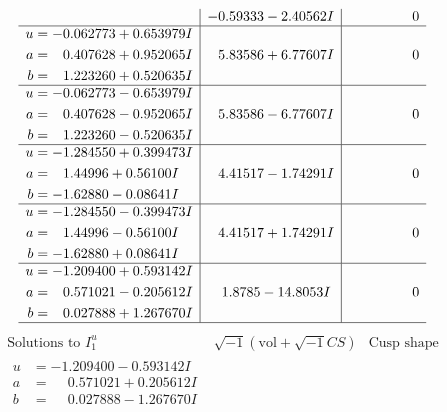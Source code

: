 \documentclass[1p]{elsarticle_modified}
\theoremstyle{definition}
\newcommand{\I}{\sqrt{-1}}
\begin{document}
$$\begin{array}{c|c|c}
 & -0.59333 - 2.40562 I & \phantom{-0.000000 } 0 \\ \hline\begin{aligned}
u &= -0.062773 + 0.653979 I \\
a &= \phantom{-}0.407628 + 0.952065 I \\
b &= \phantom{-}1.223260 + 0.520635 I\end{aligned}
 & \phantom{-}5.83586 + 6.77607 I & \phantom{-0.000000 } 0 \\ \hline\begin{aligned}
u &= -0.062773 - 0.653979 I \\
a &= \phantom{-}0.407628 - 0.952065 I \\
b &= \phantom{-}1.223260 - 0.520635 I\end{aligned}
 & \phantom{-}5.83586 - 6.77607 I & \phantom{-0.000000 } 0 \\ \hline\begin{aligned}
u &= -1.284550 + 0.399473 I \\
a &= \phantom{-}1.44996 + 0.56100 I \\
b &= -1.62880 - 0.08641 I\end{aligned}
 & \phantom{-}4.41517 - 1.74291 I & \phantom{-0.000000 } 0 \\ \hline\begin{aligned}
u &= -1.284550 - 0.399473 I \\
a &= \phantom{-}1.44996 - 0.56100 I \\
b &= -1.62880 + 0.08641 I\end{aligned}
 & \phantom{-}4.41517 + 1.74291 I & \phantom{-0.000000 } 0 \\ \hline\begin{aligned}
u &= -1.209400 + 0.593142 I \\
a &= \phantom{-}0.571021 - 0.205612 I \\
b &= \phantom{-}0.027888 + 1.267670 I\end{aligned}
 & \phantom{-}1.8785 - 14.8053 I & \phantom{-0.000000 } 0\\
 \hline 
 \end{array}$$\newpage$$\begin{array}{c|c|c}  
\text{Solutions to }I^u_{1}& \I (\text{vol} + \sqrt{-1}CS) & \text{Cusp shape}\\
 \hline 
\begin{aligned}
u &= -1.209400 - 0.593142 I \\
a &= \phantom{-}0.571021 + 0.205612 I \\
b &= \phantom{-}0.027888 - 1.267670 I\end{aligned}

\end{array}$$
\end{document}
